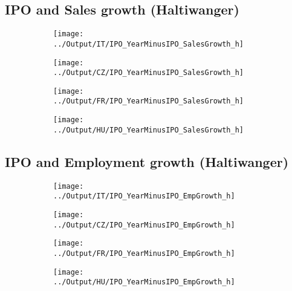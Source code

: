 \documentclass[12pt,notitlepage]{article}
\begin{document}
\subsection*{IPO and Sales growth (Haltiwanger)}
\begin{figure}[!htpb]
\centering
\caption{IPO and Number of Employees- Decomposition}
\begin{subfigure}{.49\textwidth}
    \centering
 \texttt{[image: ../Output/IT/IPO\_YearMinusIPO\_SalesGrowth\_h]}
\end{subfigure}%
\begin{subfigure}{.49\textwidth}
    \centering
 \texttt{[image: ../Output/CZ/IPO\_YearMinusIPO\_SalesGrowth\_h]}
\end{subfigure}
\begin{subfigure}{.49\textwidth}
    \centering
 \texttt{[image: ../Output/FR/IPO\_YearMinusIPO\_SalesGrowth\_h]}
\end{subfigure}%
\begin{subfigure}{.49\textwidth}
    \centering
 \texttt{[image: ../Output/HU/IPO\_YearMinusIPO\_SalesGrowth\_h]}
\end{subfigure}
\end{figure}
\pagebreak

\subsection*{IPO and Employment growth (Haltiwanger)}
\begin{figure}[!htpb]
\centering
\caption{IPO and Number of Employees- Decomposition}
\begin{subfigure}{.49\textwidth}
    \centering
 \texttt{[image: ../Output/IT/IPO\_YearMinusIPO\_EmpGrowth\_h]}
\end{subfigure}%
\begin{subfigure}{.49\textwidth}
    \centering
 \texttt{[image: ../Output/CZ/IPO\_YearMinusIPO\_EmpGrowth\_h]}
\end{subfigure}
\begin{subfigure}{.49\textwidth}
    \centering
 \texttt{[image: ../Output/FR/IPO\_YearMinusIPO\_EmpGrowth\_h]}
\end{subfigure}%
\begin{subfigure}{.49\textwidth}
    \centering
 \texttt{[image: ../Output/HU/IPO\_YearMinusIPO\_EmpGrowth\_h]}
\end{subfigure}
\end{figure}
\pagebreak
\end{document}
